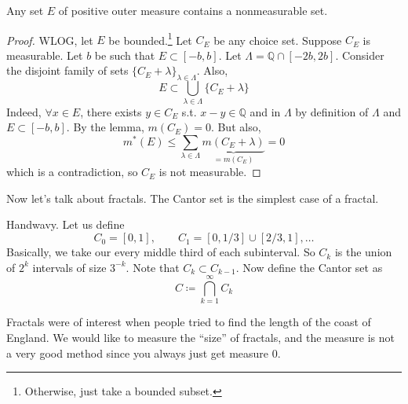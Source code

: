   \begin{theorem}
    Any set $E$ of positive outer measure contains a nonmeasurable set. 
  \end{theorem}
  \begin{proof}
    WLOG, let $E$ be bounded.\footnote{Otherwise, just take a bounded subset.} Let $C_E$ be any choice set. Suppose $C_E$ is measurable. Let $b$ be such that $E \subset [-b, b]$. Let $\Lambda = \mathbb{Q} \cap [-2b, 2b]$. Consider the disjoint family of sets $\{C_E + \lambda\}_{\lambda \in \Lambda}$. Also, 
    \begin{equation}
      E \subset \bigcup_{\lambda \in \Lambda} \{ C_E + \lambda \}
    \end{equation}
    Indeed, $\forall x \in E$, there exists $y \in C_E$ s.t. $x - y \in \mathbb{Q}$ and in $\Lambda$ by definition of $\Lambda$ and $E \subset [-b, b]$. By the lemma, $m(C_E) = 0$. But also, 
    \begin{equation}
      m^\ast (E) \leq \sum_{\lambda \in \Lambda} \underbrace{m(C_E + \lambda)}_{= m(C_E)} = 0
    \end{equation}
    which is a contradiction, so $C_E$ is not measurable. 
  \end{proof}

  Now let's talk about fractals. The Cantor set is the simplest case of a fractal. 

  \begin{definition}
    Handwavy. Let us define 
    \begin{equation}
      C_0 = [0, 1], \qquad C_1 = [0, 1/3] \cup [2/3, 1], \ldots
    \end{equation}
    Basically, we take our every middle third of each subinterval. So $C_k$ is the union of $2^k$ intervals of size $3^{-k}$. Note that $C_k \subset C_{k-1}$. Now define the Cantor set as 
    \begin{equation}
      C \coloneqq \bigcap_{k=1}^\infty C_k
    \end{equation}
  \end{definition}

  Fractals were of interest when people tried to find the length of the coast of England. We would like to measure the ``size'' of fractals, and the measure is not a very good method since you always just get measure $0$. 

